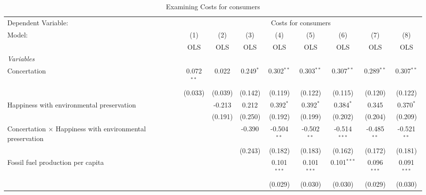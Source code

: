 
\begin{table}[htbp]
   \caption{Examining Costs for consumers}
   \centering
   \begin{tabular}{lcccccccc}
      \toprule
      Dependent Variable: & \multicolumn{8}{c}{Costs for consumers}\\
      Model:                                                           & (1)          & (2)     & (3)         & (4)           & (5)           & (6)            & (7)           & (8)\\  
                                                                       &  OLS         & OLS     & OLS         & OLS           & OLS           & OLS            & OLS           & OLS\\  
      \midrule
      \emph{Variables}\\
      Concertation                                                     & 0.072$^{**}$ & 0.022   & 0.249$^{*}$ & 0.302$^{**}$  & 0.303$^{**}$  & 0.307$^{**}$   & 0.289$^{**}$  & 0.307$^{**}$\\   
                                                                       & (0.033)      & (0.039) & (0.142)     & (0.119)       & (0.122)       & (0.115)        & (0.120)       & (0.122)\\   
      Happiness with environmental preservation                        &              & -0.213  & 0.212       & 0.392$^{*}$   & 0.392$^{*}$   & 0.384$^{*}$    & 0.345         & 0.370$^{*}$\\   
                                                                       &              & (0.191) & (0.250)     & (0.192)       & (0.199)       & (0.202)        & (0.204)       & (0.209)\\   
      Concertation $\times$ Happiness with environmental preservation  &              &         & -0.390      & -0.504$^{**}$ & -0.502$^{**}$ & -0.514$^{***}$ & -0.485$^{**}$ & -0.521$^{**}$\\   
                                                                       &              &         & (0.243)     & (0.182)       & (0.183)       & (0.162)        & (0.172)       & (0.181)\\   
      Fossil fuel production per capita                                &              &         &             & 0.101$^{***}$ & 0.101$^{***}$ & 0.101$^{***}$  & 0.096$^{***}$ & 0.091$^{***}$\\   
                                                                       &              &         &             & (0.029)       & (0.030)       & (0.030)        & (0.029)       & (0.030)\\   

\end{tabular}
\end{table}
